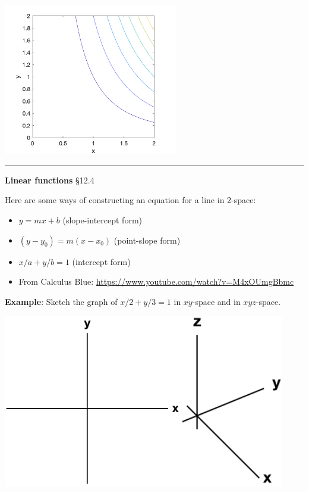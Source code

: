 \documentclass[12pt,letterpaper,noanswers]{exam}
\begin{document}
\includegraphics[width=3in]{img/C03p1a.png}

\vspace{0.2cm}
\hrule
\vspace{0.2cm}

\eject
\noindent\textbf{Linear functions} \S 12.4

Here are some ways of constructing an equation for a line in $2$-space:
\begin{itemize}
    \item $y = mx + b$ (slope-intercept form)
    \item $(y-y_0) = m(x-x_0)$ (point-slope form)
    \item $x/a+y/b = 1$ (intercept form)
    \item From Calculus Blue: \url{https://www.youtube.com/watch?v=M4xOUmgBbmc}
\end{itemize}

\noindent\textbf{Example}:
Sketch the graph of $x/2 + y/3 = 1$ in $xy$-space and in $xyz$-space.

\hfill\includegraphics[height=3in]{img/C02axes-2.png}\hfill\includegraphics[height=3in]{img/C02axes.png}\hfill
\end{document}
